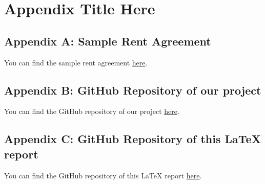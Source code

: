 
\chapter*{Appendix Title Here}

\label{AppendixX}

\section*{Appendix A: Sample Rent Agreement}
You can find the sample rent agreement \href{http://example.com/agreement}{here}.

\section*{Appendix B: GitHub Repository of our project}
You can find the GitHub repository of our project \href{https://github.com/ayush0402/humara-ghar}{here}.

\section*{Appendix C: GitHub Repository of this LaTeX report}
You can find the GitHub repository of this LaTeX report \href{http://github.com/yourreport}{here}.
